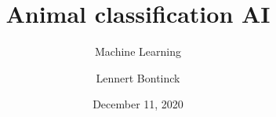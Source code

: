 \title{Animal classification AI}
\subtitle{Machine Learning}
\author{Lennert Bontinck}
\date{December 11, 2020}


